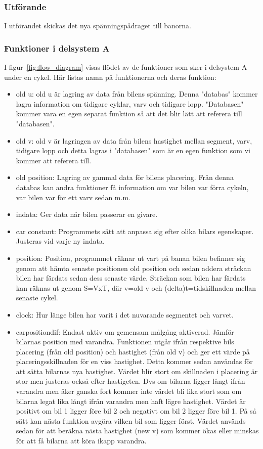     \subsubsection{Utförande}

    I utförandet skickas det nya spänningspådraget till banorna. 
	

    \subsubsection{Funktioner i delsystem A} \label{sec:system_a_funcs}
    I figur~\ref{fig:flow_diagram}  visas flödet av de funktioner som sker i delsystem A under en cykel.
    Här listas namn på funktionerna och deras funktion:
    \begin{itemize}
	\item old u: old u är lagring av data från bilens spänning. Denna "databas" kommer lagra information om tidigare cyklar, varv och tidigare lopp. "Databasen" kommer vara en egen separat funktion så att det blir lätt att referera till "databasen".
	\item old v: old v är lagringen av data från bilens hastighet mellan segment, varv, tidigare lopp och detta lagras i "databasen" som är en egen funktion som vi kommer att referera till. 
	\item old position: Lagring av gammal data för bilens placering. Från denna databas kan andra funktioner få information om var bilen var förra cykeln, var bilen var för ett varv sedan m.m.
      \item indata: Ger data när bilen passerar en givare.
      \item car constant: Programmets sätt att anpassa sig efter olika bilars egenskaper. Justeras vid varje ny indata.
      \item position: Position, programmet räknar ut vart på banan bilen befinner sig genom att hämta senaste positionen old position och sedan addera sträckan bilen har färdats sedan dess senaste värde. Sträckan som bilen har färdats kan räknas ut genom S=VxT, där v=old v och (delta)t=tidskillnaden mellan senaste cykel.
      \item clock: Hur länge bilen har varit i det nuvarande segmentet och varvet.

      \item car\textunderscore position\textunderscore dif: Endast aktiv om gemensam målgång aktiverad. Jämför bilarnas position med varandra. Funktionen utgår ifrån respektive bils placering (från old position) och hastighet (från old v) 
och ger ett värde på placeringsskillnaden för en viss hastighet. Detta kommer
sedan användas för att sätta bilarnas nya hastighet. Värdet blir stort om skillnaden i placering är stor men justeras också efter hastigeten. Dvs om bilarna ligger långt ifrån varandra men åker ganska fort kommer inte värdet bli lika stort som om bilarna legat lika långt ifrån varandra men haft lägre hastighet. Värdet är positivt om bil 1 ligger före bil 2 och negativt om bil 2 ligger före bil 1. På så sätt kan nästa funktion avgöra vilken bil som ligger först.
Värdet används sedan för att beräkna nästa hastighet (new v) som kommer ökas eller minskas för att få bilarna att köra ikapp varandra. 


\end{itemize}
